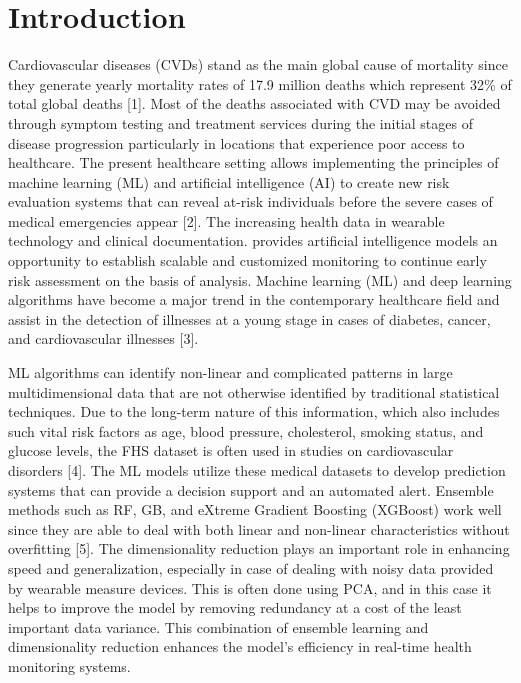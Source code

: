 \documentclass[conference]{IEEEtran}
\begin{document}
\section{Introduction}
Cardiovascular diseases (CVDs) stand as the main global cause of mortality since they generate yearly mortality rates of 17.9 million deaths which represent 32\% of total global deaths [1]. Most of the deaths associated with CVD may be avoided through symptom testing and treatment services during the initial stages of disease progression particularly in locations that experience poor access to healthcare.  The present healthcare setting allows implementing the principles of machine learning (ML) and artificial intelligence (AI) to create new risk evaluation systems that can reveal at-risk individuals before the severe cases of medical emergencies appear [2].  The increasing health data in wearable technology and clinical documentation. provides artificial intelligence models an opportunity to establish scalable and customized monitoring to continue early risk assessment on the basis of analysis.  Machine learning (ML) and deep learning algorithms have become a major trend in the contemporary healthcare field and assist in the detection of illnesses at a young stage in cases of diabetes, cancer, and cardiovascular illnesses [3].

\vspace{1em}

ML algorithms can identify non-linear and complicated patterns in large multidimensional data that are not otherwise identified by traditional statistical techniques. Due to the long-term nature of this information, which also includes such vital risk factors as age, blood pressure, cholesterol, smoking status, and glucose levels, the FHS dataset is often used in studies on cardiovascular disorders [4]. The ML models utilize these medical datasets to develop prediction systems that can provide a decision support and an automated alert. Ensemble methods such as RF, GB, and eXtreme Gradient Boosting (XGBoost) work well since they are able to deal with both linear and non-linear characteristics without overfitting [5]. The dimensionality reduction plays an important role in enhancing speed and generalization, especially in case of dealing with noisy data provided by wearable measure devices. This is often done using PCA, and in this case it helps to improve the model by removing redundancy at a cost of the least important data variance. This combination of ensemble learning and dimensionality reduction enhances the model’s efficiency in real-time health monitoring systems.
\end{document}
